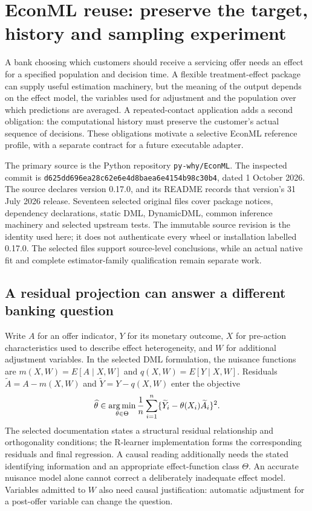 \section{EconML reuse: preserve the target, history and sampling experiment}
\label{exec19:econml-scope}

A bank choosing which customers should receive a servicing offer needs an
effect for a specified population and decision time. A flexible treatment-effect
package can supply useful estimation machinery, but the meaning of the output
depends on the effect model, the variables used for adjustment and the population
over which predictions are averaged. A repeated-contact application adds a
second obligation: the computational history must preserve the customer's
actual sequence of decisions. These obligations motivate a selective EconML
reference profile, with a separate contract for a future executable adapter.

The primary source is the Python repository \texttt{py-why/EconML}.
The inspected commit is
\texttt{d625dd696ea28c62e6e4}\allowbreak\texttt{d8baea6e4154b98c30b4},
dated 1 October 2026. The source declares version 0.17.0, and its README records that version's
31 July 2026 release. Seventeen selected original files cover package notices,
dependency declarations, static DML, DynamicDML, common inference machinery
and selected upstream tests. The immutable source revision is the identity
used here; it does not authenticate every wheel or installation labelled
0.17.0. The selected files support source-level conclusions, while an actual
native fit and complete estimator-family qualification remain separate work.
\citep{exec19_econml_source}

\subsection{A residual projection can answer a different banking question}
\label{exec19:econml-target}

Write $A$ for an offer indicator, $Y$ for its monetary outcome, $X$ for
pre-action characteristics used to describe effect heterogeneity, and $W$ for
additional adjustment variables. In the selected DML formulation, the nuisance
functions are $m(X,W)=E[A\mid X,W]$ and $q(X,W)=E[Y\mid X,W]$.
Residuals $\widetilde A=A-m(X,W)$ and
$\widetilde Y=Y-q(X,W)$ enter the objective
\begin{equation}
 \widehat\theta\in\mathop{\rm arg\,min}_{\theta\in\Theta}
 \frac{1}{n}\sum_{i=1}^n
 \{\widetilde Y_i-\theta(X_i)\widetilde A_i\}^{2}.
 \label{exec19:econml-objective}
\end{equation}
The selected documentation states a structural residual relationship and
orthogonality conditions; the R-learner implementation forms the corresponding
residuals and final regression. A causal reading additionally needs the stated
identifying information and an appropriate effect-function class $\Theta$.
An accurate nuisance model alone cannot correct a deliberately inadequate
effect model. Variables admitted to $W$ also need causal justification:
automatic adjustment for a post-offer variable can change the question.
\citep{exec19_econml_source}

